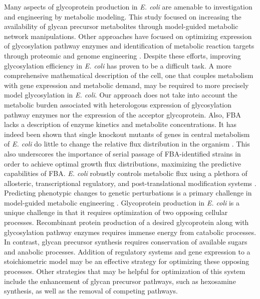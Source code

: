 \documentclass[12pt]{article}
\begin{document}
Many aspects of glycoprotein production in \textit{E. coli} are amenable to investigation and engineering by metabolic modeling. 
This study focused on increasing the availability of glycan precursor metabolites through model-guided metabolic network manipulations. 
Other approaches have focused on optimizing expression of glycosylation pathway enzymes and identification of metabolic reaction targets through proteomic and genome engineering \cite{2011-pandhal-wright-BiotechBioeng,2012-pandhal-wright-BBRC,2013-pandhal-woodruff-gill-wright-BiotechBioeng}. 
Despite these efforts, improving glycosylation efficiency in \textit{E. coli} has proven to be a difficult task. 
A more comprehensive mathematical description of the cell, one that couples metabolism with gene expression and metabolic demand, may be required to more precisely model glycosylation in \textit{E. coli}. 
Our approach does not take into account the metabolic burden associated with heterologous expression of glycosylation pathway enzymes nor the expression of the acceptor glycoprotein. 
Also, FBA lacks a description of enzyme kinetics and metabolite concentrations. 
It has indeed been shown that single knockout mutants of genes in central metabolism of \textit{E. coli} do little to change the relative flux distribution in the organism \cite{1999-sauer-bailey-JBact}. 
This also underscores the importance of serial passage of FBA-identified strains in order to achieve optimal growth flux distributions, maximizing the predictive capabilities of FBA. 
\textit{E. coli} robustly controls metabolic flux using a plethora of allosteric, transcriptional regulatory, and post-translational modification systems \cite{2008-kremling-bettenbrock-gilles-Bioinfo,2013-link-sauer-NatBiotech}. 
Predicting phenotypic changes to genetic perturbations is a primary challenge in model-guided metabolic engineering \cite{2014-link-sauer-CurOpBiotech}. 
Glycoprotein production in \textit{E. coli} is a unique challenge in that it requires optimization of two opposing cellular processes. 
Recombinant protein production of a desired glycoprotein along with glycosylation pathway enzymes requires immense energy from catabolic processes. 
In contrast, glycan precursor synthesis requires conservation of available sugars and anabolic processes. 
Addition of regulatory systems and gene expression to a stoichiometric model may be an effective strategy for optimizing these opposing processes. 
Other strategies that may be helpful for optimization of this system include the enhancement of glycan precursor pathways, such as hexosamine synthesis, as well as the removal of competing pathways. 
\end{document}
